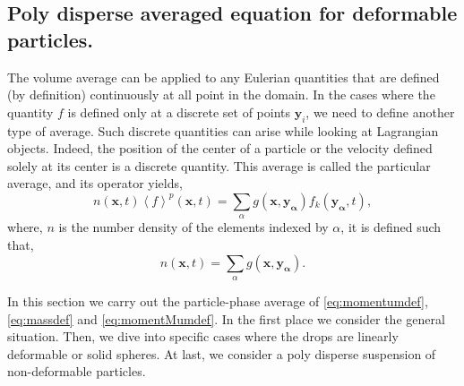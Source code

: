 \subsection{Poly disperse averaged equation for deformable particles.}
The volume average can be applied to any Eulerian quantities that are defined 
(by definition) continuously at all point in the domain.
In the cases where the quantity $f$ is defined only at a discrete set of points 
$\textbf{y}_i$, we need to define another type of average. 
Such discrete quantities can arise while looking at Lagrangian objects.
Indeed, the position of the center of a particle or the velocity defined solely at its 
center is a discrete quantity. 
This average is called the particular average, and its operator yields, 
\begin{equation}
    \label{eq:partia}
    n(\textbf{x},t)\left<f\right>^p(\textbf{x},t) 
    = \sum_{\alpha} g(\textbf{x},\bm{y_\alpha}) f_k(\bm{y_\alpha},t),
\end{equation}
where, $n$ is the number density of the elements indexed by $\alpha$, it is defined such that, 
\begin{equation}
    n(\textbf{x},t) 
    = \sum_{\alpha} g(\textbf{x},\bm{y_\alpha}).
\end{equation}

In this section we carry out the particle-phase average of \ref{eq:momentumdef}, \ref{eq:massdef} and \ref{eq:momentMumdef}.
In the first place we consider the general situation.
Then, we dive into specific cases where the drops are linearly deformable or solid spheres.
At last, we consider a poly disperse suspension of non-deformable particles.


